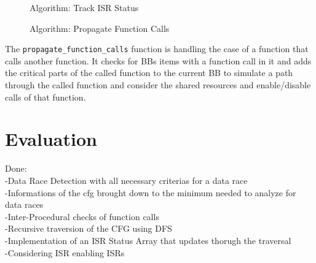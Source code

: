 \documentclass[
fancyheadings, %
%
%
]{stsreprt}
\begin{document}
{\begin{figure}[H]
{			}
			\caption{Algorithm: Track ISR Status}
		\end{figure} 
		\begin{figure}[H]
			\centering
			\caption{Algorithm: Propagate Function Calls}
		\end{figure} 
		The \texttt{propagate\_function\_calls} function is handling the case of a function that calls another function. It checks for \acp{BB} items with a function call in it and adds the critical parts of the called function to the current \ac{BB} to simulate a path through the called function and consider the shared resources and enable/disable calls of that function.
		
		\chapter{Evaluation}
		
		Done:\\
		-Data Race Detection with all necessary criterias for a data race\\
		-Informations of the cfg brought down to the minimum needed to analyze for data races\\
		-Inter-Procedural checks of function calls\\
		-Recursive traversion of the CFG using DFS\\
		-Implementation of an ISR Status Array that updates thorugh the traversal\\
		-Considering ISR enabling ISRs\\
		
}
\end{document}
